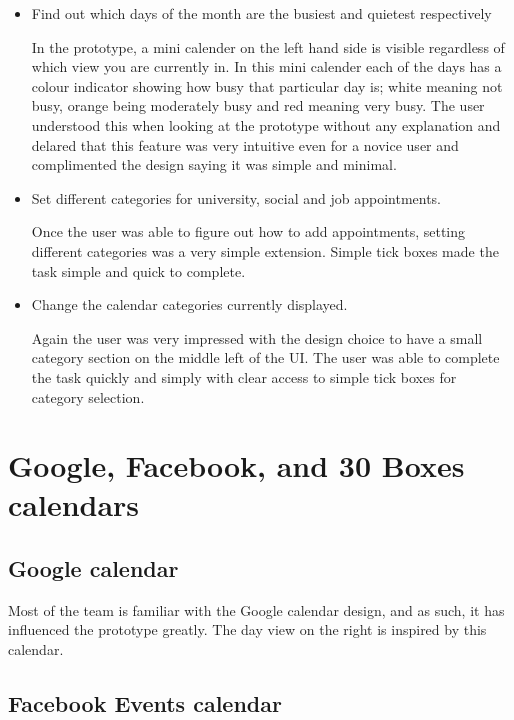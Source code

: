 \documentclass{article}
\begin{document}
\begin{itemize}
\item Find out which days of the month are the busiest and quietest
respectively

In the prototype, a mini calender on the left hand side is visible
regardless of which view you are currently in. In this mini calender
each of the days has a colour indicator showing how busy that
particular day is; white meaning not busy, orange being moderately
busy and red meaning very busy. The user understood this when looking
at the prototype without any explanation and delared that this feature
was very intuitive even for a novice user and complimented the design
saying it was simple and minimal.

\item Set different categories for university, social and job
appointments.

Once the user was able to figure out how to add appointments, setting
different categories was a very simple extension. Simple tick boxes
made the task simple and quick to complete.

\item Change the calendar categories currently displayed.

Again the user was very impressed with the design choice to have a
small category section on the middle left of the UI. The user was able
to complete the task quickly and simply with clear access to simple
tick boxes for category selection. 

\end{itemize}


\section{Google, Facebook, and 30 Boxes calendars}

\subsection{Google calendar}

Most of the team is familiar with the Google calendar design, and as
such, it has influenced the prototype greatly. The day view on the
right is inspired by this calendar.


\subsection{Facebook Events calendar}
\end{document}

